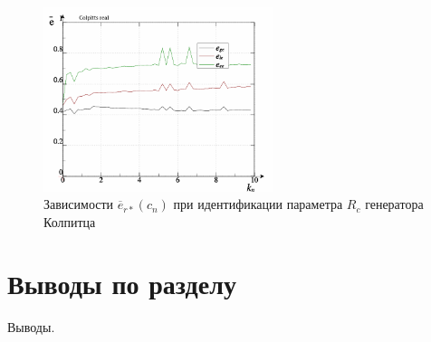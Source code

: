 \begin{figure}[htb!]
  \centerline{\includegraphics[width=0.6\textwidth]{p/colp_real_id_qi_fv5_prm_0-p_k_cn.png} }
  \caption{Зависимости $\overline{e}_{r*}(c_n)$ при идентификации параметра $R_c$ генератора Колпитца}
  \label{atu:f:colp_real_id_qi_fv5_prm_0-p_k_cn.png}
\end{figure}



\section{Выводы по разделу \thechapter}

Выводы.

